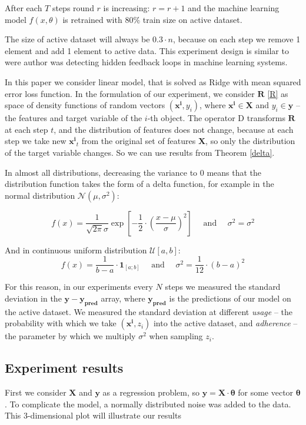 \documentclass{article}
\begin{document}
        After each $T$ steps round $r$ is increasing: $r = r+1$ and the machine learning model $f(x, \theta)$ is retrained with $80\%$ train size on active dataset. 

        The size of active dataset will always be $0.3 \cdot n$, because on each step we remove 1 element and add 1 element to active data. This experiment design is similar to \cite{khritankov2021hidden} were author was detecting hidden feedback loops in machine learning systems.

        In this paper we consider linear model, that is solved as Ridge with mean squared error loss function. In the formulation of our experiment, we consider $\mathbf{R}$ \eqref{R} as space of density functions of random vectors $(\mathbf{x^i}, y_i)$, where $\mathbf{x^i} \in \textbf{X}$ and $y_i \in \textbf{y}$ -- the features and target variable of the $i$-th object. The operator $\text{D}$ transforms $\mathbf{R}$ at each step $t$, and the distribution of features does not change, because at each step we take new $\mathbf{x^i}_t$ from the original set of features $\textbf{X}$, so only the distribution of the target variable changes. So we can use results from Theorem \ref{delta}. 

        In almost all distributions, decreasing the variance to 0 means that the distribution function takes the form of a delta function, for example in the normal distribution $\mathcal{N}(\mu, \sigma^2)$:

        \begin{equation*}
            f(x) = \dfrac{1}{\sqrt{2 \pi} \sigma} \exp\left[-\dfrac{1}{2} \cdot \left(\dfrac{x - \mu}{\sigma}\right)^2\right] \quad \text{ and } \quad \sigma^2 = \sigma^2
        \end{equation*}

        And in continuous uniform distribution $\mathcal{U}[a, b]$:
        \begin{equation*}
            f(x) = \dfrac{1}{b-a} \cdot \textbf{1}_{[a;b]} \quad \text{ and } \quad \sigma^2 = \dfrac{1}{12} \cdot (b-a)^2
        \end{equation*}

        For this reason, in our experiments every $N$ steps we measured the standard deviation in the $\mathbf{y} - \mathbf{y_{\text{pred}}}$ array, where $\mathbf{y_{\text{pred}}}$ is the predictions of our model on the active dataset. We measured the standard deviation at different \textit{usage} -- the probability with which we take $(\mathbf{x^i}, z_i)$ into the active dataset, and \textit{adherence} -- the parameter by which we multiply $\sigma^2$ when sampling $z_i$.

    \subsection{Experiment results} \label{res}
        First we consider $\mathbf{X}$ and $\mathbf{y}$ as a regression problem, so $\mathbf{y} = \mathbf{X}  \cdot \mathbf{\theta}$ for some vector $\mathbf{\theta}$. To complicate the model, a normally distributed noise was added to the data. This 3-dimensional plot will illustrate our results
        


  
\end{document}
